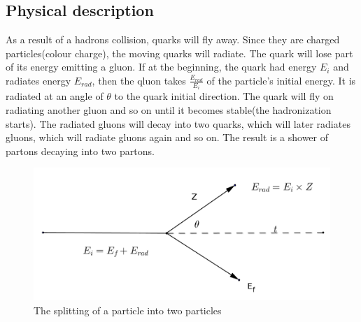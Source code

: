 \subsection{Physical description}
\noindent As a result of a hadrons collision, quarks will fly away. Since they are charged particles(colour charge), the moving quarks will radiate. The quark will lose part of its energy emitting a gluon. If at the beginning, the quark had energy $E_i$ and radiates energy $E_{rad}$, then the qluon takes $\frac{E_{rad}}{E_i}$ of the particle's initial energy.
It is radiated at an angle of $\theta$ to the quark initial direction. The quark will fly on radiating another gluon and so on until it becomes stable(the hadronization starts).
The radiated gluons will decay into two quarks, which will later radiates gluons,  which will radiate gluons again and so on. The result is a shower of partons decaying into two partons. 
\begin{figure}[hbtp]
\centering
\includegraphics[scale=.3]{images/tt.png}
\caption{The splitting of a particle into two particles}
\end{figure}



